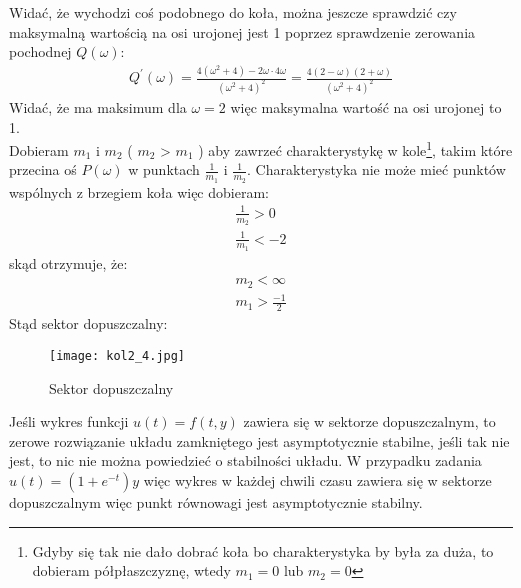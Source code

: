 \documentclass[a4paper,11pt]{article}
\begin{document}
Widać, że wychodzi coś podobnego do koła, można jeszcze sprawdzić czy maksymalną wartością na osi urojonej jest 1 poprzez sprawdzenie zerowania pochodnej \( Q(\omega) \): 
\begin{align*}
Q^{'}(\omega) = \frac{4(\omega^{2}+4)-2\omega \cdot 4\omega}{(\omega^{2}+4)^{2}}=\frac{4(2-\omega)(2+\omega)}{(\omega^{2}+4)^{2}}
\end{align*}
Widać, że ma maksimum dla \( \omega = 2 \) więc maksymalna wartość na osi urojonej to 1. \\
Dobieram \( m_{1} \) i \(m_{2}\) (  \(m_{2}\) > \( m_{1} \) ) aby zawrzeć charakterystykę w kole\footnote{Gdyby się tak nie dało dobrać koła bo charakterystyka by była za duża, to dobieram półpłaszczyznę, wtedy \( m_{1} = 0  \) lub \( m_{2} = 0  \)}, takim które przecina oś \( P(\omega) \) w punktach \( \frac{1}{m_{1}} \) i \( \frac{1}{m_{2}}\). Charakterystyka nie może mieć punktów wspólnych z brzegiem koła więc dobieram:
\begin{align*}
\frac{1}{m_{2}} > 0 \\
\frac{1}{m_{1}} < -2
\end{align*}
skąd otrzymuje, że:
\begin{align*}
m_{2} < \infty \\
m_{1} > \frac{-1}{2}
\end{align*}
Stąd sektor dopuszczalny: 
\begin{figure}[H]
\centerline{\texttt{[image: kol2\_4.jpg]}}
\caption{Sektor dopuszczalny}
\label{fig:kol2_4}
\end{figure}
Jeśli wykres funkcji \( u(t) = f(t,y) \) zawiera się w sektorze dopuszczalnym, to zerowe rozwiązanie układu zamkniętego jest asymptotycznie stabilne, jeśli tak nie jest, to nic nie można powiedzieć o stabilności układu. W przypadku zadania \( u(t) = (1+e^{-t})y \) więc wykres w każdej chwili czasu zawiera się w sektorze dopuszczalnym więc punkt równowagi jest asymptotycznie stabilny.
\end{document}
